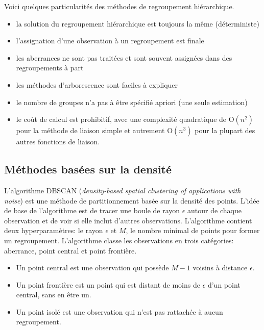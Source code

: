 \documentclass[
  11pt,
  letterpaper,
]{book}
\providecommand{\tightlist}{%
  \setlength{\itemsep}{0pt}\setlength{\parskip}{0pt}}\usepackage{longtable,booktabs,array}
\theoremstyle{definition}
\theoremstyle{remark}
\begin{document}
Voici quelques particularités des méthodes de regroupement hiérarchique.

\begin{itemize}
\tightlist
\item
  la solution du regroupement hiérarchique est toujours la même
  (déterministe)
\item
  l'assignation d'une observation à un regroupement est finale
\item
  les aberrances ne sont pas traitées et sont souvent assignées dans des
  regroupements à part
\item
  les méthodes d'arborescence sont faciles à expliquer
\item
  le nombre de groupes n'a pas à être spécifié apriori (une seule
  estimation)
\item
  le coût de calcul est prohibitif, avec une complexité quadratique de
  \(\mathrm{O}(n^2)\) pour la méthode de liaison simple et autrement
  \(\mathrm{O}(n^3)\) pour la plupart des autres fonctions de liaison.
\end{itemize}

\hypertarget{muxe9thodes-basuxe9es-sur-la-densituxe9}{%
\subsection{Méthodes basées sur la
densité}\label{muxe9thodes-basuxe9es-sur-la-densituxe9}}

L'algorithme DBSCAN (\emph{density-based spatial clustering of
applications with noise}) est une méthode de partitionnement basée sur
la densité des points. L'idée de base de l'algorithme est de tracer une
boule de rayon \(\epsilon\) autour de chaque observation et de voir si
elle inclut d'autres observations. L'algorithme contient deux
hyperparamètres: le rayon \(\epsilon\) et \(M\), le nombre minimal de
points pour former un regroupement. L'algorithme classe les observations
en trois catégories: aberrance, point central et point frontière.

\begin{itemize}
\tightlist
\item
  Un point central est une observation qui possède \(M-1\) voisins à
  distance \(\epsilon\).
\item
  Un point frontière est un point qui est distant de moins de
  \(\epsilon\) d'un point central, sans en être un.
\item
  Un point isolé est une observation qui n'est pas rattachée à aucun
  regroupement.
\end{itemize}
\end{document}
